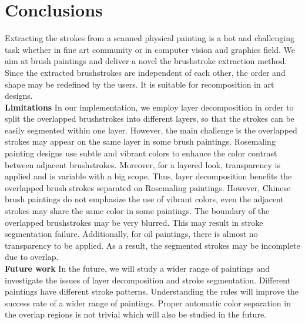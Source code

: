 
\section{Conclusions}
Extracting the strokes from a scanned physical painting is a hot and challenging task whether in fine art community or in computer vision and graphics field. We aim at brush paintings and deliver a novel the brushstroke extraction method. Since the extracted brushstrokes are independent of each other, the order and shape may be redefined by the users. It is suitable for recomposition in art designs.\\
\textbf{Limitations}  
In our implementation, we employ layer decomposition in order to split the overlapped brushstrokes into different layers, so that the strokes can be easily segmented within one layer. However, the main challenge is the overlapped strokes may appear on the same layer in some brush paintings. Rosemaling painting designs use subtle and vibrant colors to enhance the color contrast between adjacent brushstrokes. Moreover, for a layered look, transparency is applied and is variable with a big scope. Thus, layer decomposition benefits the overlapped brush strokes separated on Rosemaling paintings. However, Chinese brush paintings do not emphasize the use of vibrant colors, even the adjacent strokes may share the same color in some paintings. The boundary of the overlapped brushstrokes may be very blurred. This may result in stroke segmentation failure.
Additionally, for oil paintings, there is almost no transparency to be applied. As a result, the segmented strokes may be incomplete due to overlap.\\
\textbf{Future work} 
In the future, we will study a wider range of paintings and investigate the issues of layer decomposition and stroke segmentation. Different paintings have different stroke patterns. Understanding the rules will improve the success rate of a wider range of paintings. Proper automatic color separation in the overlap regions is not trivial which will also be studied in the future.